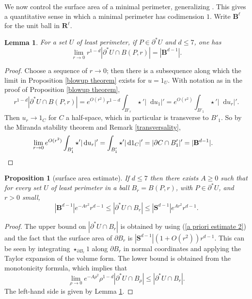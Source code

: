 \documentclass[reqno,10pt]{amsart}
\newcommand{\RR}{\mathbf{R}}
\newcommand{\Sph}{\mathbf S}
\newcommand{\Ball}{\mathbf{B}}
\newcommand*\dif{\mathop{}\!\mathrm{d}}
\newtheorem{lemma}[theorem]{Lemma}
\newtheorem{proposition}[theorem]{Proposition}
\theoremstyle{definition}
\numberwithin{equation}{section}
\begin{document}
We now control the surface area of a minimal perimeter, generalizing \cite[Remark 5.13]{Giusti77}.
This gives a quantitative sense in which a minimal perimeter has codimension $1$.
Write $\Ball^\ell$ for the unit ball in $\RR^\ell$.

\begin{lemma}\label{least perimeter minimal size}
For a set $U$ of least perimeter, if $P \in \partial^* U$ and $d \leq 7$, one has
$$\lim_{r \to 0} r^{1 - d} |\partial^* U \cap B(P, r)| = |\Ball^{d - 1}|.$$
\end{lemma}
\begin{proof}
Choose a sequence of $r \to 0$; then there is a subsequence along which the limit in Proposition \ref{blowup theorem} exists for $u = 1_U$.
With notation as in the proof of Proposition \ref{blowup theorem},
$$r^{1 - d} |\partial^* U \cap B(P, r)| = e^{O(r^2)} r^{1 - d}\int_{B'_r} \star'|\dif u_1|' = e^{O(r^2)} \int_{B'_1} \star'|\dif u_r|'.$$
Then $u_r \to 1_C$ for $C$ a half-space, which in particular is transverse to $B'_1$.
So by the Miranda stability theorem and Remark \ref{transversality},
\begin{align*}
\lim_{r \to 0} e^{O(r^2)} \int_{B'_1} \star'|\dif u_r|' &= \int_{B'_1} \star'|\dif 1_C|' = |\partial C \cap B'_1|' = |\Ball^{d - 1}|. \qedhere
\end{align*}
\end{proof}

\begin{proposition}[surface area estimate]\label{doubling dimension}
If $d \leq 7$ then there exists $A \geq 0$ such that for every set $U$ of least perimeter in a ball $B_r = B(P, r)$, with $P \in \partial^* U$, and $r > 0$ small,
$$|\Ball^{d - 1}|e^{-Ar^2}r^{d - 1} \leq |\partial^*U \cap B_r| \leq |\Sph^{d - 1}|e^{Ar^2} r^{d - 1}.$$
\end{proposition}
\begin{proof}
The upper bound on $|\partial^* U \cap B_r|$ is obtained by using (\ref{a priori estimate 2}) and the fact that the surface area of $\partial B_r$ is $|\Sph^{d - 1}|(1 + O(r^2))r^{d - 1}$.
This can be seen by integrating $\star_{\partial B_r} 1$ along $\partial B_r$ in normal coordinates and applying the Taylor expansion of the volume form.
The lower bound is obtained from the monotonicity formula, which implies that
$$\lim_{\rho \to 0} e^{-A\rho^2} \rho^{1 - d} |\partial^* U \cap B_\rho| \leq |\partial^* U \cap B_r|.$$
The left-hand side is given by Lemma \ref{least perimeter minimal size}.
\end{proof}
\end{document}
